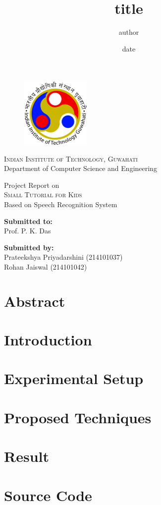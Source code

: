 \documentclass{article}
\begin{document}
\title{title}
\author{author}
\date{date}

\begin{titlepage}
\begin{figure}[t]
    \centering\includegraphics[width=0.3\textwidth]{IITG_logo}
\end{figure}
\begin{center}
    \textsc{ \LARGE{Indian Institute of Technology, Guwahati \\}}
	\textnormal{ \LARGE{Department of Computer Science and Engineering\\ }}
	 
    \textup{Project Report on}\\
	\textsc{ \LARGE{Small Tutorial for Kids\\ }}
	\textup{Based on Speech Recognition System}\\ 
	\vspace{30mm}
	\fontsize{10mm}{7mm}\selectfont
\end{center}

\vspace{25mm}

\begin{minipage}[t]{0.4\textwidth}
	\textnormal{\large{\bf Submitted to:\\}}
	{\large Prof. P. K. Das}
\end{minipage}\hfill
\begin{minipage}[t]{0.6\textwidth}\raggedleft
	\textnormal{\large{\bf Submitted by:\\}}
	{\large Prateekshya Priyadarshini (214101037)\\Rohan Jaiswal (214101042)}
\end{minipage}

\vspace{20mm}
\end{titlepage}
\tableofcontents
\newpage
\section{Abstract}
\section{Introduction}
\section{Experimental Setup}
\section{Proposed Techniques}
\section{Result}
\section{Source Code}
\end{document}
